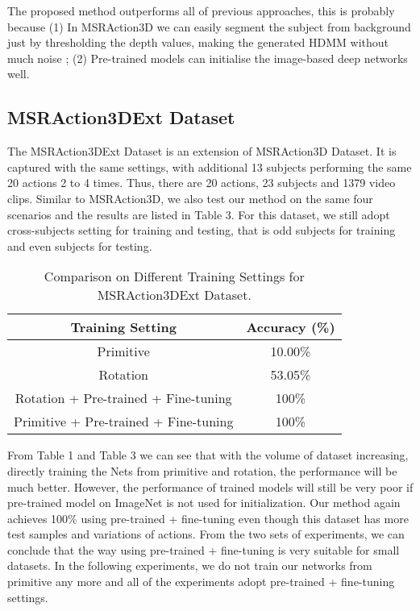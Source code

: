 \documentclass[conference]{IEEEtran}
\begin{document}
The proposed method outperforms all of previous approaches, this is probably because (1) In MSRAction3D we can easily segment the subject from background just by thresholding the depth values, making the generated HDMM without much noise ; (2) Pre-trained models can initialise the image-based deep networks well.

\subsection{MSRAction3DExt Dataset}
The MSRAction3DExt Dataset is an extension of MSRAction3D Dataset. It is captured with the same settings, with additional 13 subjects performing the same 20 actions 2 to 4 times. Thus, there are 20 actions, 23 subjects and 1379 video clips.
Similar to MSRAction3D, we also test our method on the same four scenarios and the results are listed in Table 3. For this dataset, we still adopt cross-subjects setting for training and testing, that is odd subjects for training and even subjects for testing.

\begin{table}[h]
\centering
\caption{Comparison on Different Training Settings for MSRAction3DExt Dataset.}
\begin{tabular}{|c|c|}
\hline
Training Setting & Accuracy (\%)\\
\hline
Primitive & 10.00\%  \\
\hline
Rotation & 53.05\%\\
\hline
Rotation + Pre-trained + Fine-tuning & 100\%  \\
\hline
Primitive + Pre-trained + Fine-tuning & 100\%  \\
\hline
\end{tabular}
\end{table}
From Table 1 and Table 3 we can see that with the volume of dataset increasing, directly training the Nets from primitive and rotation, the performance will be much better. However, the performance of trained models will still be very poor if pre-trained model on ImageNet is not used for initialization. Our method again achieves 100\% using pre-trained + fine-tuning even though this dataset has more test samples and variations of actions.
From the two sets of experiments, we can conclude that the way using pre-trained + fine-tuning is very suitable for small datasets.
In the following experiments, we do not train our networks from primitive any more and all of the experiments adopt pre-trained + fine-tuning settings.
\end{document}
